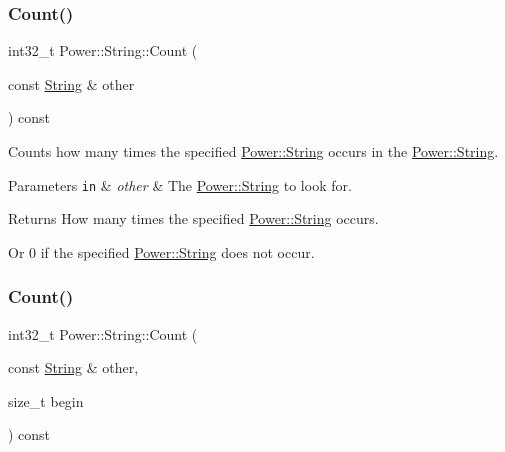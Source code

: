 \subsubsection{\texorpdfstring{Count()}{Count()}\hspace{0.1cm}{\footnotesize\ttfamily [1/12]}}
{\footnotesize\ttfamily int32\+\_\+t Power\+::\+String\+::\+Count (\begin{DoxyParamCaption}\item[{const \hyperlink{class_power_1_1_string}{String} \&}]{other }\end{DoxyParamCaption}) const\hspace{0.3cm}{\ttfamily [inline]}}



Counts how many times the specified \hyperlink{class_power_1_1_string}{Power\+::\+String} occurs in the \hyperlink{class_power_1_1_string}{Power\+::\+String}. 


\begin{DoxyParams}[1]{Parameters}
\mbox{\tt in}  & {\em other} & The \hyperlink{class_power_1_1_string}{Power\+::\+String} to look for. \\
\hline
\end{DoxyParams}
\begin{DoxyReturn}{Returns}
How many times the specified \hyperlink{class_power_1_1_string}{Power\+::\+String} occurs. 

Or 0 if the specified \hyperlink{class_power_1_1_string}{Power\+::\+String} does not occur. 
\end{DoxyReturn}
\mbox{\label{class_power_1_1_string_a28f6ec0778012f430557541f1f0ae8f4}} 
\subsubsection{\texorpdfstring{Count()}{Count()}\hspace{0.1cm}{\footnotesize\ttfamily [2/12]}}
{\footnotesize\ttfamily int32\+\_\+t Power\+::\+String\+::\+Count (\begin{DoxyParamCaption}\item[{const \hyperlink{class_power_1_1_string}{String} \&}]{other,  }\item[{size\+\_\+t}]{begin }\end{DoxyParamCaption}) const\hspace{0.3cm}{\ttfamily [inline]}}



